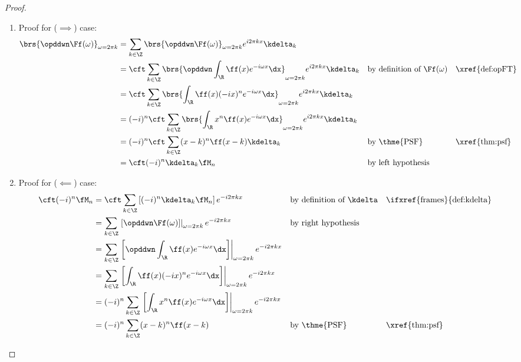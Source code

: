 \begin{proof}
\begin{enumerate}
  \item Proof for ($\implies$) case:
    \begin{align*}
      \brs{\opddwn  \Ff(\omega)}_{\omega=2\pi k}
        &= \sum_{k\in\Z} \brs{\opddwn  \Ff(\omega)}_{\omega=2\pi k}  e^{i2\pi kx} \kdelta_k
      \\&= \cft \sum_{k\in\Z} \brs{\opddwn \int_\R  \ff(x) e^{-i\omega x} \dx}_{\omega=2\pi k} e^{i2\pi kx}  \kdelta_k
        && \text{by definition of $\Ff(\omega)$}
        && \text{\xref{def:opFT}}
      \\&= \cft \sum_{k\in\Z} \brs{\int_\R  \ff(x)(-ix)^n e^{-i\omega x} \dx}_{\omega=2\pi k} e^{i2\pi kx}  \kdelta_k
      \\&= (-i)^n \cft \sum_{k\in\Z} \brs{\int_\R  x^n \ff(x)  e^{-i\omega x} \dx}_{\omega=2\pi k} e^{i2\pi kx}  \kdelta_k
      \\&= (-i)^n \cft \sum_{k\in\Z} (x-k)^n \ff(x-k)  \kdelta_k
        && \text{by \thme{PSF}}
        && \text{\xref{thm:psf}}
      \\&= \cft (-i)^n \kdelta_k \fM_n
        && \text{by left hypothesis}
    \end{align*}


  \item Proof for ($\impliedby$) case:
    \begin{align*}
      \cft (-i)^n \fM_n
        &= \cft \sum_{k\in\Z} \left[(-i)^n \kdelta_k \fM_n \right] e^{-i2\pi kx}
        && \text{by definition of $\kdelta$}
        && \text{\ifxref{frames}{def:kdelta}}
      \\&= \sum_{k\in\Z} \left.
           \left[\opddwn  \Ff(\omega)\right]\right|_{\omega=2\pi k}
           e^{-i2\pi kx}
        && \text{by right hypothesis}
      \\&= \sum_{k\in\Z} \left.
           \left[
           \opddwn
           \int_\R  \ff(x) e^{-i\omega x} \dx
           \right]
           \right|_{\omega=2\pi k} e^{-i2\pi kx}
      \\&= \sum_{k\in\Z} \left.
           \left[
           \int_\R  \ff(x)(-ix)^n e^{-i\omega x} \dx
           \right]
           \right|_{\omega=2\pi k} e^{-i2\pi kx}
      \\&= (-i)^n \sum_{k\in\Z} \left.
           \left[
           \int_\R  x^n \ff(x)  e^{-i\omega x} \dx
           \right]
           \right|_{\omega=2\pi k} e^{-i2\pi kx}
      \\&= (-i)^n \sum_{k\in\Z} (x-k)^n \ff(x-k)
        && \text{by \thme{PSF}}
        && \text{\xref{thm:psf}}
    \end{align*}

\end{enumerate}
\end{proof}


